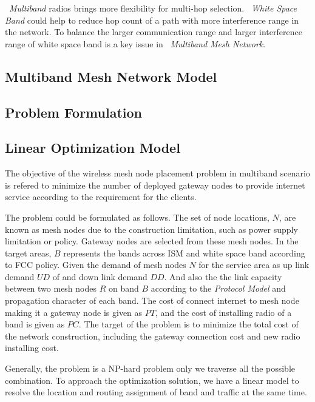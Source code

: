 ~\emph{Multiband} radios brings more flexibility for multi-hop selection. ~\emph{White Space Band} could help to reduce hop count of a path with more interference range in the network. To balance the larger communication range and larger interference range of white space band is a key issue in ~\emph{Multiband Mesh Network}.



\subsection{Multiband Mesh Network Model}
\label{subsec:architecturemodel}





\subsection{Problem Formulation}

\subsection{Linear Optimization Model}
 

The objective of the wireless mesh node placement problem in multiband scenario is refered to
minimize the number of deployed gateway nodes to provide internet service according to the requirement for the clients. 

The problem could be formulated as follows.
The set of node locations, $N$, are known as mesh nodes due to the construction limitation, such as power supply limitation or policy. Gateway nodes are selected from these mesh nodes.
In the target areas, $B$ represents the bands across ISM and white space band according to FCC policy.
Given the demand of mesh nodes $N$ for the service area as up link demand $UD$ of and down link demand $DD$. And also the the link capacity between two mesh nodes $R$ on band $B$ according to the \emph{Protocol Model} and propagation character of each band.
The cost of connect internet to mesh node making it a gateway node is given as $PT$, and the cost of installing radio of a band is given as $PC$.
The target of the problem is to minimize the total cost of the network construction, including the gateway connection cost and new radio installing cost.

Generally, the problem is a NP-hard problem only we traverse all the possible combination. To approach the optimization solution, we have a linear model to resolve the location and routing assignment of band and traffic at the same time.


